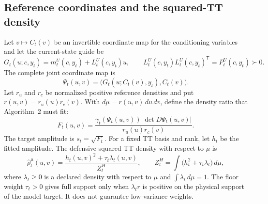 \documentclass[11pt]{article}
\begin{document}
\subsection{Reference coordinates and the squared-TT density}

Let $v\mapsto C_t(v)$ be an invertible coordinate map for the conditioning
variables and let the current-state guide be
\begin{equation}
 G_t(u;c,y_t)=m_t^U(c,y_t)+L_t^U(c,y_t)u,
 \qquad L_t^U(c,y_t)L_t^U(c,y_t)^\mathsf T=P_t^U(c,y_t)\succ0.
 \label{eq:algthree-guide-map}
\end{equation}
The complete joint coordinate map is
\begin{equation}
 \Psi_t(u,v)=\bigl(G_t(u;C_t(v),y_t),C_t(v)\bigr).
 \label{eq:algthree-joint-map}
\end{equation}
Let $r_u$ and $r_c$ be normalized positive reference densities and put
$r(u,v)=r_u(u)r_c(v)$.  With $d\mu=r(u,v)\,du\,dv$, define the density ratio
that Algorithm~2 must fit:
\begin{equation}
 F_t(u,v)=
 \frac{\gamma_t(\Psi_t(u,v))
       \left|\det D\Psi_t(u,v)\right|}{r_u(u)r_c(v)}.
 \label{eq:algthree-pullback-target}
\end{equation}
The target amplitude is $s_t=\sqrt{F_t}$.  For a fixed TT basis and rank, let
$h_t$ be the fitted amplitude.  The defensive squared-TT density with respect
to $\mu$ is
\begin{equation}
 \widehat\rho_t^\mu(u,v)
 =\frac{h_t(u,v)^2+\tau_t\lambda_t(u,v)}{Z_t^H},
 \qquad
 Z_t^H=\int\!\bigl(h_t^2+\tau_t\lambda_t\bigr)\,d\mu,
 \label{eq:algthree-squared-tt}
\end{equation}
where $\lambda_t\geq0$ is a declared density with respect to $\mu$ and
$\int\lambda_t\,d\mu=1$.  The floor weight $\tau_t>0$ gives full support only
when $\lambda_t r$ is positive on the physical support of the model target.
It does not guarantee low-variance weights.
\end{document}
